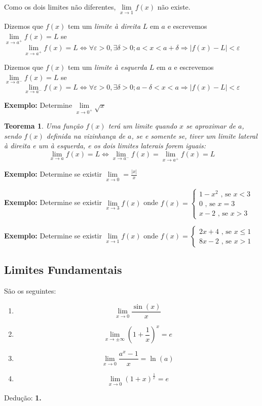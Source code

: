 \documentclass[oneside,a4paper,12pt]{article}
\newtheorem{theorem}{Teorema}[section]
\begin{document}
Como os dois limites não diferentes, $\lim\limits_{x \rightarrow 1}f(x)$ não existe.

Dizemos que $f(x)$ tem um {\it limite à direita} $L$ em $a$ e escrevemos $\lim\limits_{x \rightarrow a^{+}}f(x)=L$ se 
	$$\lim\limits_{x \rightarrow a^{+}}f(x) = L \Leftrightarrow \forall \varepsilon > 0, \exists \delta > 0 ; a < x < a + \delta \Rightarrow |f(x) - L| < \varepsilon$$

Dizemos que $f(x)$ tem um {\it limite à esquerda} $L$ em $a$ e escrevemos $\lim\limits_{x \rightarrow a^{-}}f(x)=L$ se 
$$\lim\limits_{x \rightarrow a^{-}}f(x) = L \Leftrightarrow \forall \varepsilon > 0, \exists \delta > 0 ; a - \delta < x < a \Rightarrow |f(x) - L| < \varepsilon$$

{\bf Exemplo: } Determine $\lim\limits_{x \rightarrow 0^{+}}\sqrt{x}$
\vspace{200pt}

\begin{theorem}
	Uma função $f(x)$ terá um limite quando $x$ se aproximar de $a$, sendo $f(x)$ definida na vizinhança de $a$, se e somente se, tiver um limite lateral à direita e um à esquerda, e os dois limites laterais forem iguais:
	$$\lim\limits_{x \rightarrow a}f(x) = L \Leftrightarrow \lim\limits_{x \rightarrow a^{-}}f(x) = \lim\limits_{x \rightarrow a^{+}}f(x) = L$$
\end{theorem}

\newpage
{\bf Exemplo: } Determine se existir $\lim\limits_{x \rightarrow 0} = \frac{|x|}{x}$
\vspace{300pt}

{\bf Exemplo: } Determine se existir $\lim\limits_{x \rightarrow 3}f(x)$ onde $f(x) = \begin{cases}
1 - x^2 \text{ , se } x<3 \\
0		\text{ , se } x = 3 \\
x-2		\text{ , se } x >3 
\end{cases}
$


\vspace{350pt}

{\bf Exemplo: } Determine se existir $\lim\limits_{x \rightarrow 1}f(x)$ onde $f(x) = \begin{cases}
2x + 4 \text{ , se } x \leq 1 \\
8x - 2 \text{ , se } x > 1
\end{cases}
$
\vspace{300pt}

\subsection{Limites Fundamentais}
São os seguintes:
\begin{enumerate}
	\item $$\lim\limits_{x \rightarrow 0}\frac{\sin(x)}{x}$$
	\item $$\lim\limits_{x \rightarrow \pm \infty}\left(1 + \frac{1}{x} \right)^{x} = e$$
	\item $$\lim\limits_{x \rightarrow 0}\frac{a^{x}-1}{x} = \ln(a)$$
	\item $$\lim\limits_{x \rightarrow 0}(1+x)^{\frac{1}{x}} = e$$
\end{enumerate}
\newpage
Dedução:
{\bf 1.} 
\newpage
\end{document}
